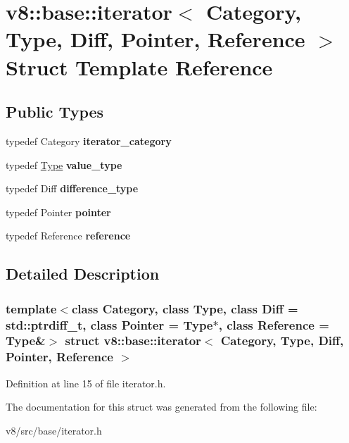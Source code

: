 \hypertarget{structv8_1_1base_1_1iterator}{}\section{v8\+:\+:base\+:\+:iterator$<$ Category, Type, Diff, Pointer, Reference $>$ Struct Template Reference}
\label{structv8_1_1base_1_1iterator}
\subsection*{Public Types}
\begin{DoxyCompactItemize}
\item 
\mbox{\label{structv8_1_1base_1_1iterator_a6c8560b8561f24b9343815688dfff2f0}} 
typedef Category {\bfseries iterator\+\_\+category}
\item 
\mbox{\label{structv8_1_1base_1_1iterator_a350e66ad8a1415bf897e38e3a978e856}} 
typedef \mbox{\hyperlink{classstatic_01const_01StackFrame_1_1Type}{Type}} {\bfseries value\+\_\+type}
\item 
\mbox{\label{structv8_1_1base_1_1iterator_a903f2e17f676bee827433bdd3d8e7d6a}} 
typedef Diff {\bfseries difference\+\_\+type}
\item 
\mbox{\label{structv8_1_1base_1_1iterator_abde7f3b231653762ad049e10e5a9cb84}} 
typedef Pointer {\bfseries pointer}
\item 
\mbox{\label{structv8_1_1base_1_1iterator_affd7a0cceb09f908e6866f0181d9dab4}} 
typedef Reference {\bfseries reference}
\end{DoxyCompactItemize}


\subsection{Detailed Description}
\subsubsection*{template$<$class Category, class Type, class Diff = std\+::ptrdiff\+\_\+t, class Pointer = Type$\ast$, class Reference = Type\&$>$\newline
struct v8\+::base\+::iterator$<$ Category, Type, Diff, Pointer, Reference $>$}



Definition at line 15 of file iterator.\+h.



The documentation for this struct was generated from the following file\+:\begin{DoxyCompactItemize}
\item 
v8/src/base/iterator.\+h\end{DoxyCompactItemize}
